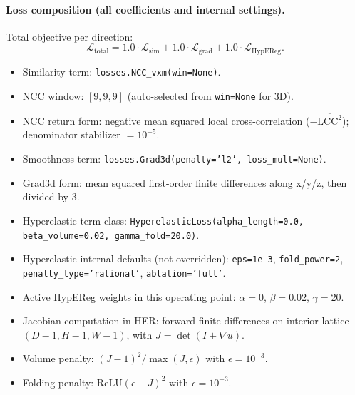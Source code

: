 \documentclass[11pt,a4paper]{article}
\begin{document}
\paragraph{Loss composition (all coefficients and internal settings).}
Total objective per direction:
\[
\mathcal{L}_{\mathrm{total}}
=
1.0\cdot\mathcal{L}_{\mathrm{sim}}
+1.0\cdot\mathcal{L}_{\mathrm{grad}}
+1.0\cdot\mathcal{L}_{\mathrm{HypEReg}}.
\]
\begin{itemize}
\item Similarity term: \texttt{losses.NCC\_vxm(win=None)}.
\item NCC window: \([9,9,9]\) (auto-selected from \texttt{win=None} for 3D).
\item NCC return form: negative mean squared local cross-correlation (\(-\overline{\mathrm{LCC}^2}\)); denominator stabilizer \(=10^{-5}\).
\item Smoothness term: \texttt{losses.Grad3d(penalty='l2', loss\_mult=None)}.
\item Grad3d form: mean squared first-order finite differences along x/y/z, then divided by 3.
\item Hyperelastic term class: \texttt{HyperelasticLoss(alpha\_length=0.0, beta\_volume=0.02, gamma\_fold=20.0)}.
\item Hyperelastic internal defaults (not overridden): \texttt{eps=1e-3}, \texttt{fold\_power=2}, \texttt{penalty\_type='rational'}, \texttt{ablation='full'}.
\item Active HypEReg weights in this operating point: \(\alpha=0\), \(\beta=0.02\), \(\gamma=20\).
\item Jacobian computation in HER: forward finite differences on interior lattice \((D-1,H-1,W-1)\), with \(J=\det(I+\nabla u)\).
\item Volume penalty: \((J-1)^2/\max(J,\epsilon)\) with \(\epsilon=10^{-3}\).
\item Folding penalty: \(\mathrm{ReLU}(\epsilon-J)^2\) with \(\epsilon=10^{-3}\).
\end{itemize}
\end{document}
